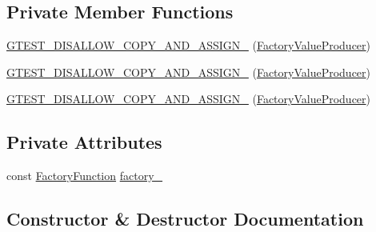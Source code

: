\subsection*{Private Member Functions}
\begin{DoxyCompactItemize}
\item 
\mbox{\hyperlink{classtesting_1_1_default_value_1_1_factory_value_producer_a19e5afa4fea1707fe4fa8a50325a4cf9}{G\+T\+E\+S\+T\+\_\+\+D\+I\+S\+A\+L\+L\+O\+W\+\_\+\+C\+O\+P\+Y\+\_\+\+A\+N\+D\+\_\+\+A\+S\+S\+I\+G\+N\+\_\+}} (\mbox{\hyperlink{classtesting_1_1_default_value_1_1_factory_value_producer}{Factory\+Value\+Producer}})
\item 
\mbox{\hyperlink{classtesting_1_1_default_value_1_1_factory_value_producer_a19e5afa4fea1707fe4fa8a50325a4cf9}{G\+T\+E\+S\+T\+\_\+\+D\+I\+S\+A\+L\+L\+O\+W\+\_\+\+C\+O\+P\+Y\+\_\+\+A\+N\+D\+\_\+\+A\+S\+S\+I\+G\+N\+\_\+}} (\mbox{\hyperlink{classtesting_1_1_default_value_1_1_factory_value_producer}{Factory\+Value\+Producer}})
\item 
\mbox{\hyperlink{classtesting_1_1_default_value_1_1_factory_value_producer_a19e5afa4fea1707fe4fa8a50325a4cf9}{G\+T\+E\+S\+T\+\_\+\+D\+I\+S\+A\+L\+L\+O\+W\+\_\+\+C\+O\+P\+Y\+\_\+\+A\+N\+D\+\_\+\+A\+S\+S\+I\+G\+N\+\_\+}} (\mbox{\hyperlink{classtesting_1_1_default_value_1_1_factory_value_producer}{Factory\+Value\+Producer}})
\end{DoxyCompactItemize}
\subsection*{Private Attributes}
\begin{DoxyCompactItemize}
\item 
const \mbox{\hyperlink{classtesting_1_1_default_value_a5763a68d75e0a4c97fcaff708e2df803}{Factory\+Function}} \mbox{\hyperlink{classtesting_1_1_default_value_1_1_factory_value_producer_ab3a016297d3a8fd3c2849c5a4d202d9b}{factory\+\_\+}}
\end{DoxyCompactItemize}


\subsection{Constructor \& Destructor Documentation}
\mbox{\label{classtesting_1_1_default_value_1_1_factory_value_producer_adc9253b20288be937687b3cefa7ef476}} 
